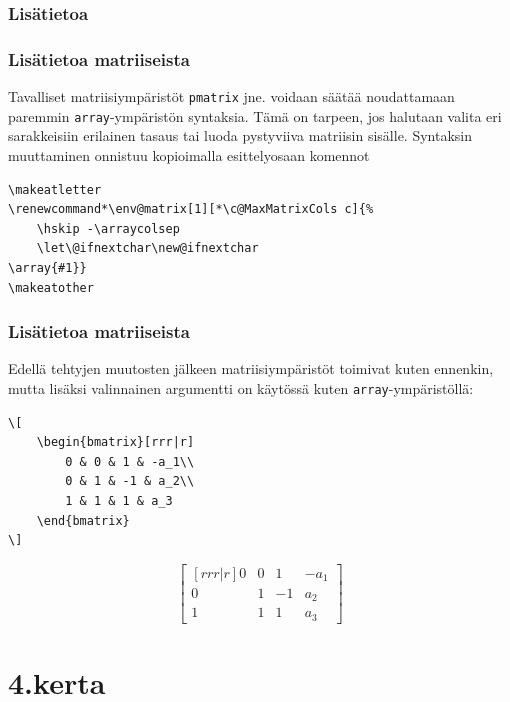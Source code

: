 \subsubsection{Lisätietoa}
\begin{frame}[fragile]
    \frametitle{Lisätietoa matriiseista}
    Tavalliset matriisiympäristöt \verb-pmatrix- jne. voidaan säätää noudattamaan paremmin \verb-array--ympäristön syntaksia.
    \vaihto
    Tämä on tarpeen, jos halutaan valita eri sarakkeisiin erilainen tasaus tai luoda pystyviiva matriisin sisälle. 
    \vaihto
    Syntaksin muuttaminen onnistuu kopioimalla esittelyosaan komennot\vaihto
    \begin{Verbatim}[frame=single]
\makeatletter
\renewcommand*\env@matrix[1][*\c@MaxMatrixCols c]{%
    \hskip -\arraycolsep
    \let\@ifnextchar\new@ifnextchar
\array{#1}}
\makeatother
    \end{Verbatim}
\end{frame}
\begin{frame}[fragile]
    \frametitle{Lisätietoa matriiseista}
    Edellä tehtyjen muutosten jälkeen matriisiympäristöt toimivat kuten ennenkin, mutta lisäksi valinnainen argumentti on käytössä kuten \verb-array--ympäristöllä:
    \vaihto
    \begin{minipage}{4.2cm}
        \begin{scriptsize}
            \begin{Verbatim}[frame=single]
\[
    \begin{bmatrix}[rrr|r]
        0 & 0 & 1 & -a_1\\
        0 & 1 & -1 & a_2\\
        1 & 1 & 1 & a_3
    \end{bmatrix}
\]
            \end{Verbatim}
        \end{scriptsize}
    \end{minipage}
    \begin{minipage}{4cm}
        \[
            \begin{bmatrix}[rrr|r]
                0 & 0 & 1 & -a_1\\
                0 & 1 & -1 & a_2\\
                1 & 1 & 1 & a_3
            \end{bmatrix}
        \]
    \end{minipage}
\end{frame}


\section{4.kerta}
